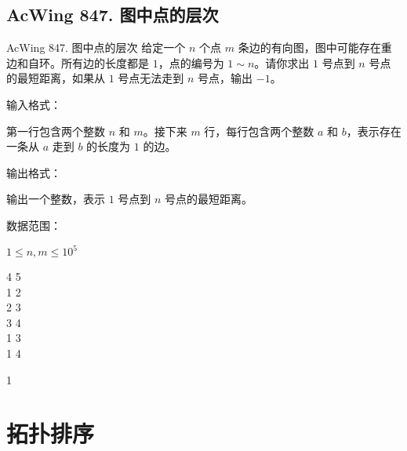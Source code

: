 \subsection{AcWing 847. 图中点的层次}
\begin{titledbox}{AcWing 847. 图中点的层次}
    给定一个 $n$ 个点 $m$ 条边的有向图，图中可能存在重边和自环。所有边的长度都是 $1$，点的编号为 $1 \sim n$。请你求出 $1$ 号点到 $n$ 号点的最短距离，如果从 $1$ 号点无法走到 $n$ 号点，输出 $-1$。

    输入格式：

    第一行包含两个整数 $n$ 和 $m$。接下来 $m$ 行，每行包含两个整数 $a$ 和 $b$，表示存在一条从 $a$ 走到 $b$ 的长度为 $1$ 的边。

    输出格式：

    输出一个整数，表示 $1$ 号点到 $n$ 号点的最短距离。

    数据范围：

    $1 \le n,m \le 10^5$

    \begin{inputblock}
        4 5 \\
        1 2 \\
        2 3 \\
        3 4 \\
        1 3 \\
        1 4
    \end{inputblock}
    \begin{outputblock}
        1
    \end{outputblock}
\end{titledbox}


\section{拓扑排序}

